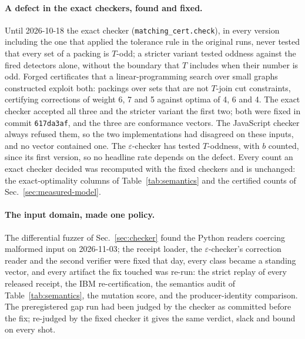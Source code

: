 \documentclass[aps,pra,twocolumn,superscriptaddress,nofootinbib,longbibliography,floatfix]{revtex4-2}
\newcommand{\eps}{\varepsilon}
\newcommand{\T}{T}
\begin{document}
\paragraph*{A defect in the exact checkers, found and fixed.} Until 2026-10-18 the exact checker (\texttt{matching\_cert.check}), in every version including the one that applied the tolerance rule in the original runs, never tested that every set of a packing is $\T$-odd; a stricter variant tested oddness against the fired detectors alone, without the boundary that $\T$ includes when their number is odd. Forged certificates that a linear-programming search over small graphs constructed exploit both: packings over sets that are not $\T$-join cut constraints, certifying corrections of weight 6, 7 and 5 against optima of 4, 6 and 4. The exact checker accepted all three and the stricter variant the first two; both were fixed in commit \texttt{617da3af}, and the three are conformance vectors. The JavaScript checker always refused them, so the two implementations had disagreed on these inputs, and no vector contained one. The $\eps$-checker has tested $\T$-oddness, with $b$ counted, since its first version, so no headline rate depends on the defect. Every count an exact checker decided was recomputed with the fixed checkers and is unchanged: the exact-optimality columns of Table~\ref{tab:semantics} and the certified counts of Sec.~\ref{sec:measured-model}.

\paragraph*{The input domain, made one policy.} The differential fuzzer of Sec.~\ref{sec:checker} found the Python readers coercing malformed input on 2026-11-03; the receipt loader, the $\eps$-checker's correction reader and the second verifier were fixed that day, every class became a standing vector, and every artifact the fix touched was re-run: the strict replay of every released receipt, the IBM re-certification, the semantics audit of Table~\ref{tab:semantics}, the mutation score, and the producer-identity comparison. The preregistered gap run had been judged by the checker as committed before the fix; re-judged by the fixed checker it gives the same verdict, slack and bound on every shot.
\end{document}
